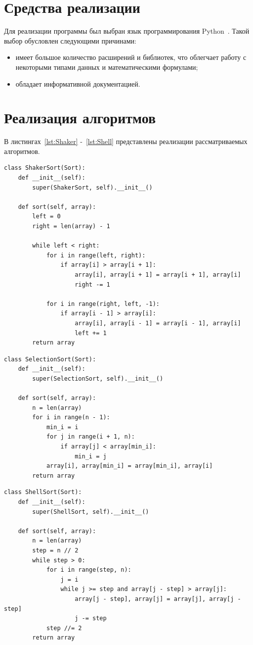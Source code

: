 \documentclass[12pt]{report}
\begin{document}
    \section{Средства реализации}
    Для реализации программы был выбран язык программирования Python~\cite{python}.
    Такой выбор обусловлен следующими причинами:
    \begin{itemize}
        \item имеет большое количество расширений и библиотек,
        что облегчает работу с некоторыми типами данных и математическими формулами;
        \item обладает информативной документацией.
    \end{itemize}


    \section{Реализация алгоритмов}
    В листингах~\ref{lst:Shaker} -~\ref{lst:Shell} представлены реализации рассматриваемых алгоритмов.
    \newpage
    \captionsetup{singlelinecheck=false, justification=raggedright}
    \begin{lstlisting}[caption=Шейкерная сортировка, label={lst:Shaker}]
class ShakerSort(Sort):
	def __init__(self):
		super(ShakerSort, self).__init__()
	
	def sort(self, array):
		left = 0
		right = len(array) - 1
		
		while left < right:
			for i in range(left, right):
				if array[i] > array[i + 1]:
					array[i], array[i + 1] = array[i + 1], array[i]
					right -= 1
			
			for i in range(right, left, -1):
				if array[i - 1] > array[i]:
					array[i], array[i - 1] = array[i - 1], array[i]
					left += 1
		return array
    \end{lstlisting}

    \begin{lstlisting}[caption=Сортировка выбором, label={lst:Select}]
class SelectionSort(Sort):
	def __init__(self):
		super(SelectionSort, self).__init__()
	
	def sort(self, array):
		n = len(array)
		for i in range(n - 1):
			min_i = i
			for j in range(i + 1, n):
				if array[j] < array[min_i]:
					min_i = j
			array[i], array[min_i] = array[min_i], array[i]
		return array
    \end{lstlisting}
    \newpage
    \begin{lstlisting}[caption=Сортировка Шелла, label={lst:Shell}]
class ShellSort(Sort):
	def __init__(self):
		super(ShellSort, self).__init__()
		
	def sort(self, array):
		n = len(array)
		step = n // 2
		while step > 0:
			for i in range(step, n):
				j = i
				while j >= step and array[j - step] > array[j]:
					array[j - step], array[j] = array[j], array[j - step]
					j -= step
			step //= 2
		return array
    \end{lstlisting}
\end{document}
